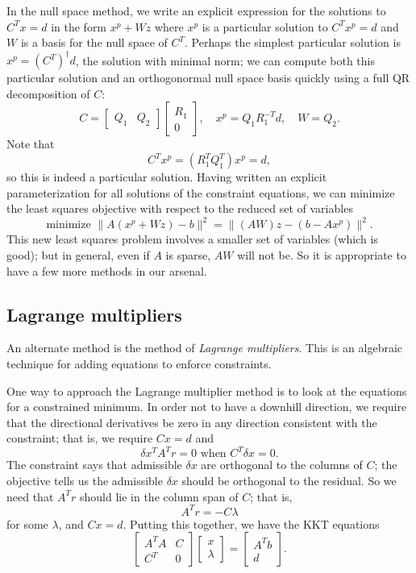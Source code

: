 \documentclass[12pt, leqno]{article} %
\begin{document}
In the null space method, we write an explicit expression for the solutions
to $C^T x = d$ in the form $x^p + W z$ where $x^p$ is a particular solution
to $C^T x^p = d$ and $W$ is a basis for the null space of $C^T$.  Perhaps the
simplest particular solution is $x^p = (C^T)^\dagger d$, the solution with
minimal norm; we can compute both
this particular solution and an orthogonormal null space basis quickly
using a full QR decomposition of $C$:
\[
  C =
    \begin{bmatrix} Q_1 & Q_2 \end{bmatrix}
    \begin{bmatrix} R_1 \\ 0 \end{bmatrix}, \quad
  x^p = Q_1 R_1^{-T} d, \quad W = Q_2.
\]
Note that
\[
  C^T x^p = (R_1^T Q_1^T) x^p = d,
\]
so this is indeed a particular solution.
Having written an explicit parameterization for all solutions of the
constraint equations, we can minimize the least squares objective with
respect to the reduced set of variables
\[
  \mbox{minimize } \|A(x^p + Wz) - b\|^2 = \|(AW)z - (b-Ax^p)\|^2.
\]
This new least squares problem involves a smaller set of variables
(which is good); but in general, even if $A$ is sparse, $AW$ will not be.
So it is appropriate to have a few more methods in our arsenal.

\subsection{Lagrange multipliers}

An alternate method is the method of {\em Lagrange multipliers}.
This is an algebraic technique for adding equations to enforce constraints.

One way to approach the Lagrange multiplier method is to look at the
equations for a constrained minimum.  In order not to have a downhill
direction, we require that the directional derivatives be zero in any
direction consistent with the constraint; that is, we require $Cx = d$
and
\[
  \delta x^T A^T r = 0 \mbox{ when } C^T \delta x = 0.
\]
The constraint says that admissible $\delta x$ are
orthogonal to the columns of $C$; the objective tells us the admissible
$\delta x$ should be orthogonal to the residual.  So we need that $A^T r$
should lie in the column span of $C$; that is,
\[
  A^T r = -C \lambda
\]
for some $\lambda$, and $Cx = d$.  Putting this together,
we have the KKT equations
\[
  \begin{bmatrix}
    A^T A & C \\
    C^T & 0
  \end{bmatrix}
  \begin{bmatrix} x \\ \lambda \end{bmatrix} =
  \begin{bmatrix} A^T b \\ d \end{bmatrix}.
\]
\end{document}
